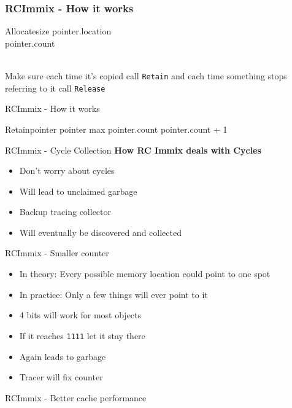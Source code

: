 \documentclass{beamer}
\begin{document}
\begin{frame}[fragile]
\frametitle{RCImmix - How it works}
	\begin{pseudocode}{Allocate}{size}
	pointer.location \GETS {}\\
	pointer.count \\
	\end{pseudocode}\\
	Make sure each time it's copied call \texttt{Retain} and each time something stops referring to it call \texttt{Release}
\end{frame}

\begin{frame}{RCImmix - How it works}
	\begin{pseudocode}{Retain}{pointer}
	\IF pointer \NOT max
		\THEN pointer.count \GETS pointer.count + 1
	\end{pseudocode}
		
\end{frame}

\begin{frame}{RCImmix - Cycle Collection}
	\textbf{How RC Immix deals with Cycles}
	\begin{itemize}
		\item Don't worry about cycles
		\item Will lead to unclaimed garbage
		\pause
		\item Backup tracing collector
		\item Will eventually be discovered and collected
	\end{itemize}
\end{frame}

\begin{frame}{RCImmix - Smaller counter}
	\begin{itemize}
		\item In theory: Every possible memory location could point to one spot
		\item In practice: Only a few things will ever point to it
		\item 4 bits will work for most objects
		\item If it reaches \texttt{1111} let it stay there
		\item Again leads to garbage
		\item Tracer will fix counter
	\end{itemize}
\end{frame}

\begin{frame}{RCImmix - Better cache performance}
	
\end{frame}
\end{document}
